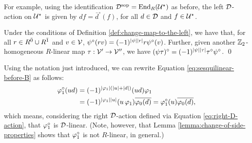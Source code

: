 For example, using the identification $\mathcal{D}^{\mathrm{sop}} = \operatorname{End}_R (\mathcal U^\star)$ as before, the left $\mathcal{D}$-action on $\mathcal U^\star$ is given by $df = \bar d^\circ (f)$, for all $d\in \mathcal{D}$ and $f\in \mathcal U^\star$.

\begin{lemma}\label{lemma:change-of-side-properties}
	Under the conditions of Definition \ref{def:change-map-to-the-left}, we have that, for all $r\in R^{\bar0} \cup R^{\bar1}$ and $v\in \mathcal V$,  $\psi^\circ (rv) = (-1)^{|\psi||r|} r \psi^\circ (v)$.
	Further, given another $\mathbb{Z}_2$-homogeneous $R$-linear map $\tau: \mathcal V' \to \mathcal V''$, we have $(\psi\tau)^\circ = (-1)^{|\psi||\tau|} \tau^\circ\psi^\circ$. \qed
\end{lemma}



Using the notation just introduced, we can rewrite Equation \eqref{eq:sesquilinear-before-B} as follows:
%
\begin{equation}\label{eq:vphi1-circ-is-D-linear}
	\begin{split}
		\varphi_1^\circ (ud) &= (-1)^{|\varphi_1|(|u|+|d|)} (ud)\varphi_1 \\
		&=(-1)^{|\varphi_1||u|}(u\,\varphi_1) \overline{\varphi_0(d)} =
		\varphi_1^\circ (u) \overline{\varphi_0(d)},
	\end{split}
\end{equation}
%
which means, considering the right $\mathcal{D}$-action defined via Equation \eqref{eq:right-D-action},
that $\varphi_1^\circ$ is $\mathcal{D}$-linear. (Note, however, that Lemma \ref{lemma:change-of-side-properties} shows that $\varphi_1^\circ$ is not $R$-linear, in general.)

